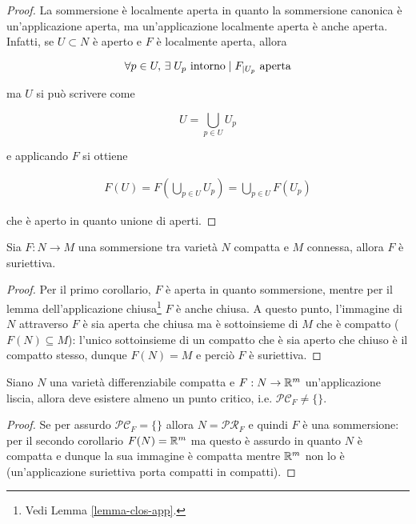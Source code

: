 \begin{proof}
	La sommersione è localmente aperta in quanto la sommersione canonica è un'applicazione aperta, ma un'applicazione localmente aperta è anche aperta. Infatti, se $ U \subset N $ è aperto e $ F $ è localmente aperta, allora
	
	\begin{equation}
		\forall p \in U, \, \exists \; U_{p} \text{ intorno} \mid F_{|U_{p}} \text{ aperta}
	\end{equation}

	ma $ U $ si può scrivere come
	
	\begin{equation}
		U = \bigcup_{p \in U} U_{p}
	\end{equation}

	e applicando $ F $ si ottiene
	
	\begin{align}
		F(U) = F \left( \bigcup_{p \in U} U_{p} \right) = \bigcup_{p \in U} F(U_{p})
	\end{align}

	che è aperto in quanto unione di aperti.
\end{proof}

\begin{corollary}[2]
	Sia $ F : N \to M $ una sommersione tra varietà $ N $ compatta e $ M $ connessa, allora $ F $ è suriettiva.
\end{corollary}

\begin{proof}
	Per il primo corollario, $ F $ è aperta in quanto sommersione, mentre per il lemma dell'applicazione chiusa\footnote{%
		Vedi Lemma \ref{lemma-clos-app}.%
	} $ F $ è anche chiusa. A questo punto, l'immagine di $ N $ attraverso $ F $ è sia aperta che chiusa ma è sottoinsieme di $ M $ che è compatto ($ F(N) \subseteq M $): l'unico sottoinsieme di un compatto che è sia aperto che chiuso è il compatto stesso, dunque $ F(N) = M $ e perciò $ F $ è suriettiva.
\end{proof}

\begin{corollary}[3]
	Siano $ N $ una varietà differenziabile compatta e $ F : N \to \mathbb{R}^{m} $ un'applicazione liscia, allora deve esistere almeno un punto critico, i.e. $ \mathcal{PC}_{F} \neq \{\} $.
\end{corollary}

\begin{proof}
	Se per assurdo $ \mathcal{PC}_{F} = \{\} $ allora $ N = \mathcal{PR}_{F} $ e quindi $ F $ è una sommersione: per il secondo corollario $ F(N) = \mathbb{R}^{m} $ ma questo è assurdo in quanto $ N $ è compatta e dunque la sua immagine è compatta mentre $ \mathbb{R}^{m} $ non lo è (un'applicazione suriettiva porta compatti in compatti).
\end{proof}

